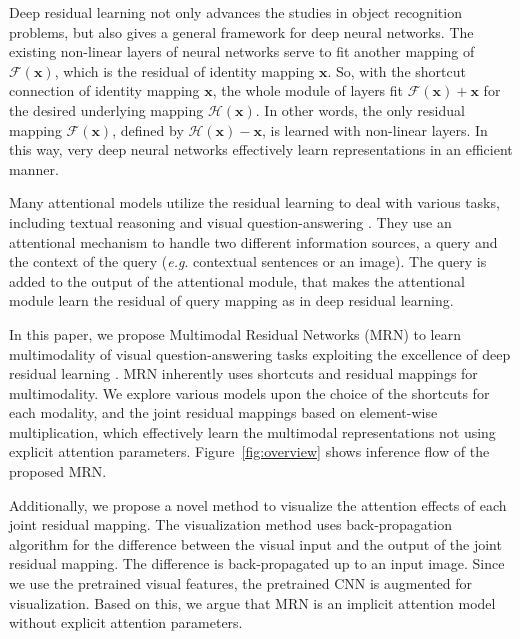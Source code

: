 \documentclass{article}
\newcommand{\vx}[0]{\mathbf{x}}
\newcommand{\onedot}[0]{.\xspace}
\newcommand{\eg}[0]{\emph{e.g}\onedot}
\begin{document}
Deep residual learning \cite{He2015} not only advances the studies in object recognition problems, but also gives a general framework for deep neural networks. The existing non-linear layers of neural networks serve to fit another mapping of $\mathcal{F}(\vx)$, which is the residual of identity mapping $\vx$. So, with the shortcut connection of identity mapping $\vx$, the whole module of layers fit $\mathcal{F}(\vx) + \vx$ for the desired underlying mapping $\mathcal{H}(\vx)$. In other words, the only residual mapping $\mathcal{F}(\vx)$, defined by $\mathcal{H}(\vx) - \vx$, is learned with non-linear layers. In this way, very deep neural networks effectively learn representations in an efficient manner. 

Many attentional models utilize the residual learning to deal with various tasks, including textual reasoning \cite{Sukhbaatar2015,Rocktaschel2015} and visual question-answering \cite{Yang2015}. They use an attentional mechanism to handle two different information sources, a query and the context of the query (\eg contextual sentences or an image). The query is added to the output of the attentional module, that makes the attentional module learn the residual of query mapping as in deep residual learning. 


In this paper, we propose Multimodal Residual Networks (MRN) to learn multimodality of visual question-answering tasks exploiting the excellence of deep residual learning \cite{He2015}. MRN inherently uses shortcuts and residual mappings for multimodality. We explore various models upon the choice of the shortcuts for each modality, and the joint residual mappings based on element-wise multiplication, which effectively learn the multimodal representations not using explicit attention parameters. Figure~\ref{fig:overview} shows inference flow of the proposed MRN.

Additionally, we propose a novel method to visualize the attention effects of each joint residual mapping. The visualization method uses back-propagation algorithm \cite{rumelhart1986} for the difference between the visual input and the output of the joint residual mapping. The difference is back-propagated up to an input image. Since we use the pretrained visual features, the pretrained CNN is augmented for visualization. Based on this, we argue that MRN is an implicit attention model without explicit attention parameters.
\end{document}
